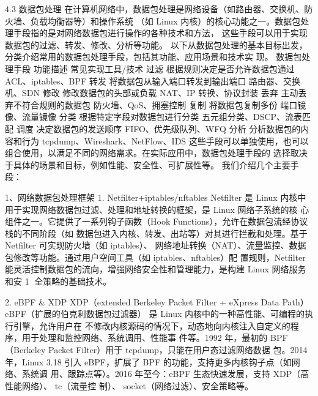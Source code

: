 
4.3 数据包处理
在计算机网络中，数据包处理是网络设备（如路由器、交换机、防火墙、负载均衡器等）和操作系统
（如 Linux 内核）的核心功能之一。数据包处理手段指的是对网络数据包进行操作的各种技术和方法，
这些手段可以用于实现数据包的过滤、转发、修改、分析等功能。
以下从数据包处理的基本目标出发，分类介绍常用的数据包处理手段，包括其功能、应用场景和技术实
现。
 数据包处理手段 功能描述                   常见实现工具/技术
 过滤           根据规则决定是否允许数据包通过 ACL、iptables、BPF
 转发           将数据包从输入端口转发到输出端口 路由器、交换机、SDN
 修改           修改数据包的头部或负载       NAT、IP 转换、协议封装
 丢弃           主动丢弃不符合规则的数据包     防火墙、QoS、拥塞控制
 复制           将数据包复制多份          端口镜像、流量镜像
 分类           根据特定字段对数据包进行分类    五元组分类、DSCP、流表匹配
 调度           决定数据包的发送顺序        FIFO、优先级队列、WFQ
 分析           分析数据包的内容和行为       tcpdump、Wireshark、NetFlow、IDS
这些手段可以单独使用，也可以组合使用，以满足不同的网络需求。在实际应用中，数据包处理手段的
选择取决于具体的场景和目标，例如性能、安全性、可扩展性等。
我们介绍几个主要手段：

1、网络数据包处理框架
1. Netfilter+iptables/nftables
Netfilter 是 Linux 内核中用于实现网络数据包过滤、处理和地址转换的框架，是 Linux 网络子系统的核
心组件之一。它提供了一系列钩子函数（Hook Functions），允许在数据包流经协议栈的不同阶段（如
数据包进入内核、转发、出站等）对其进行拦截和处理。基于 Netfilter 可实现防火墙（如 iptables）、
网络地址转换（NAT）、流量监控、数据包修改等功能。通过用户空间工具（如 iptables、nftables）配
置规则，Netfilter 能灵活控制数据包的流向，增强网络安全性和管理能力，是构建 Linux 网络服务和安
                                                                1
全策略的基础技术。




2. eBPF & XDP XDP（extended Berkeley Packet Filter + eXpress Data
Path）
eBPF（扩展的伯克利数据包过滤器） 是 Linux 内核中的一种高性能、可编程的执行引擎，允许用户在
不修改内核源码的情况下，动态地向内核注入自定义的程序，用于处理和监控网络、系统调用、性能事
件等。1992 年，最初的 BPF（Berkeley Packet Filter）用于 ﻿tcpdump﻿，只能在用户态过滤网络数据
包。2014 年，Linux 3.18 引入 eBPF，扩展了 BPF 的功能，支持更多内核钩子点（如网络、系统调
用、跟踪点等）。2016 年至今：eBPF 生态快速发展，支持 XDP（高性能网络）、 ﻿tc﻿（流量控
制）、 socket﻿（网络过滤）、安全策略等。




